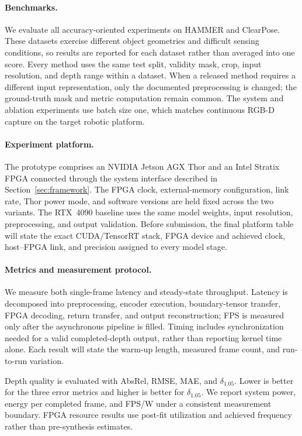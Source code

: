 \paragraph{Benchmarks.}
We evaluate all accuracy-oriented experiments on HAMMER and ClearPose.  These
datasets exercise different object geometries and difficult sensing conditions,
so results are reported for each dataset rather than averaged into one score.
Every method uses the same test split, validity mask, crop, input resolution,
and depth range within a dataset.  When a released method requires a different
input representation, only the documented preprocessing is changed; the
ground-truth mask and metric computation remain common.  The system and
ablation experiments use batch size one, which matches continuous RGB-D
capture on the target robotic platform.

\paragraph{Experiment platform.}
The prototype comprises an NVIDIA Jetson AGX Thor and an Intel Stratix FPGA
connected through the system interface described in Section~\ref{sec:framework}.
The FPGA clock, external-memory configuration, link rate, Thor power mode, and
software versions are held fixed across the two \system{} variants.  The
RTX~4090 baseline uses the same model weights, input resolution, preprocessing,
and output validation.  Before submission, the final platform table will state
the exact CUDA/TensorRT stack, FPGA device and achieved clock, host--FPGA link,
and precision assigned to every model stage.

\paragraph{Metrics and measurement protocol.}
We measure both single-frame latency and steady-state throughput.  Latency is
decomposed into preprocessing, encoder execution, boundary-tensor transfer,
FPGA decoding, return transfer, and output reconstruction; FPS is measured only
after the asynchronous pipeline is filled.  Timing includes synchronization
needed for a valid completed-depth output, rather than reporting kernel time
alone.  Each result will state the warm-up length, measured frame count, and
run-to-run variation.

Depth quality is evaluated with AbsRel, RMSE, MAE, and $\delta_{1.05}$.  Lower
is better for the three error metrics and higher is better for
$\delta_{1.05}$.  We report system power, energy per completed frame, and FPS/W
under a consistent measurement boundary.  FPGA resource results use post-fit
utilization and achieved frequency rather than pre-synthesis estimates.

